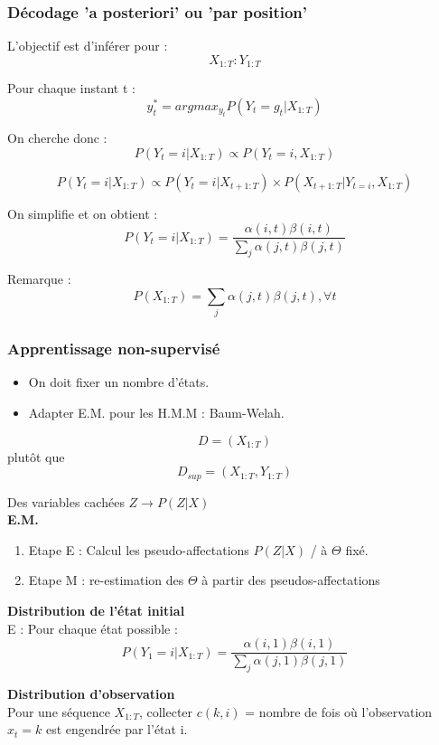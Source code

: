 \documentclass{article}
\begin{document}
\subsubsection{Décodage 'a posteriori' ou 'par position'}

L'objectif est d'inférer pour : $$X_{1:T} : Y_{1:T}$$ 

Pour chaque instant t : $$ y_t^* = argmax_{y_t} P(Y_t = g_t | X_{1:T}) $$

On cherche donc : $$P(Y_t = i | X_{1:T}) \propto P(Y_t = i, X_{1:T}) $$

$$ P(Y_t = i | X_{1:T}) \propto P(Y_t = i | X_{t+1:T}) \times P(X_{t+1:T} | Y_{t=i}, X_{1:T}) $$

On simplifie et on obtient : $$ P(Y_t = i | X_{1:T}) = \frac{\alpha(i, t) \beta(i, t)}{\sum_j \alpha(j, t) \beta(j, t)} $$

Remarque : $$ P(X_{1:T}) = \sum_j \alpha(j, t) \beta(j, t), \forall t $$

\subsubsection{Apprentissage non-supervisé}

\begin{itemize}
\item On doit fixer un nombre d'états.
\item Adapter E.M. pour les H.M.M : Baum-Welah.
\end{itemize}

$$ D = (X_{1:T}) $$ plutôt que $$ D_{sup} = (X_{1:T}, Y_{1:T}) $$

Des variables cachées $ Z \rightarrow P(Z | X) $ 
\\
\textbf{E.M.}
\begin{enumerate}
\item Etape E : Calcul les pseudo-affectations
$ P(Z | X)$ / à $\Theta$ fixé.
\item Etape M : re-estimation des $\Theta$ à partir des pseudos-affectations
\end{enumerate}

\textbf{Distribution de l'état initial}
\\
E : Pour chaque état possible : 
$$ P(Y_1 = i | X_{1:T}) = \frac{\alpha(i, 1) \beta(i, 1)}{\sum_j \alpha(j, 1) \beta(j, 1)} $$

\textbf{Distribution d'observation}
\\
Pour une séquence $X_{1:T}$, collecter $c(k, i)$ = nombre de fois où l'observation $x_t = k$ est engendrée par l'état i.
\end{document}

